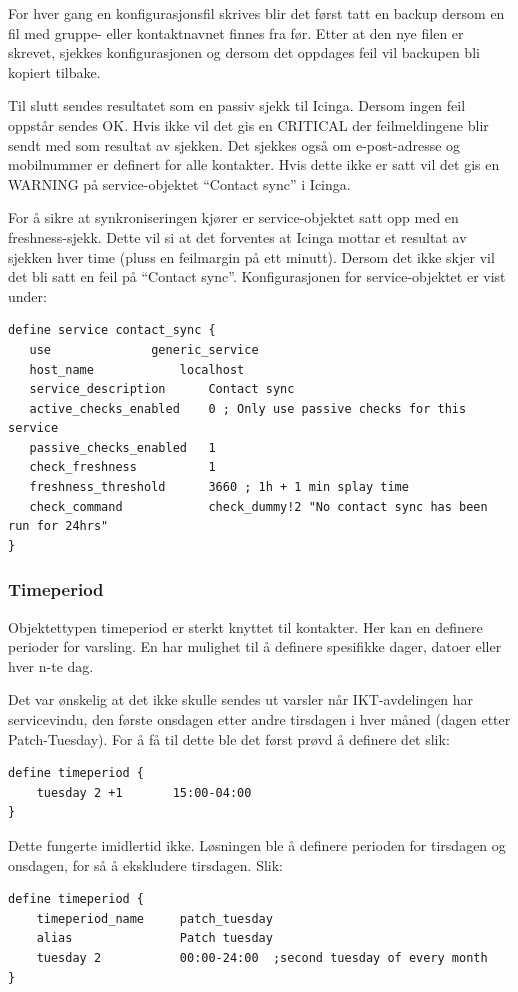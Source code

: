 For hver gang en konfigurasjonsfil skrives blir det først tatt en backup dersom en fil med gruppe- eller kontaktnavnet finnes fra før. Etter at den nye filen er skrevet, sjekkes konfigurasjonen og dersom det oppdages feil vil backupen bli kopiert tilbake. 

Til slutt sendes resultatet som en passiv sjekk til Icinga. Dersom ingen feil oppstår sendes OK. Hvis ikke vil det gis en CRITICAL der feilmeldingene blir sendt med som resultat av sjekken. Det sjekkes også om e-post-adresse og mobilnummer er definert for alle kontakter. Hvis dette ikke er satt vil det gis en WARNING på service-objektet ``Contact sync'' i Icinga.

For å sikre at synkroniseringen kjører er service-objektet satt opp med en freshness-sjekk. Dette vil si at det forventes at Icinga mottar et resultat av sjekken hver time (pluss en feilmargin på ett minutt). Dersom det ikke skjer vil det bli satt en feil på ``Contact sync''. Konfigurasjonen for service-objektet er vist under:
\begin{lstlisting}[style=example]
define service contact_sync {
   use 				generic_service
   host_name    	  	localhost
   service_description  	Contact sync
   active_checks_enabled   	0 ; Only use passive checks for this service
   passive_checks_enabled  	1
   check_freshness      	1
   freshness_threshold     	3660 ; 1h + 1 min splay time 
   check_command     		check_dummy!2 "No contact sync has been run for 24hrs" 
}
\end{lstlisting}

\subsubsection{Timeperiod}

Objektettypen timeperiod er sterkt knyttet til kontakter. Her kan en definere perioder for varsling. En har mulighet til å definere spesifikke dager, datoer eller hver n-te dag. 

Det var ønskelig at det ikke skulle sendes ut varsler når IKT-avdelingen har servicevindu, den første onsdagen etter andre tirsdagen i hver måned (dagen etter Patch-Tuesday\cite{wiki:patch}). For å få til dette ble det først prøvd å definere det slik:

\begin{lstlisting}[style=example]
define timeperiod {
    tuesday 2 +1       15:00-04:00
}
\end{lstlisting}

Dette fungerte imidlertid ikke. Løsningen ble å definere perioden for tirsdagen og onsdagen, for så å ekskludere tirsdagen. Slik:
\begin{lstlisting}[style=example]
define timeperiod {
    timeperiod_name 	patch_tuesday
    alias           	Patch tuesday
    tuesday 2          	00:00-24:00  ;second tuesday of every month
}
\end{lstlisting}

